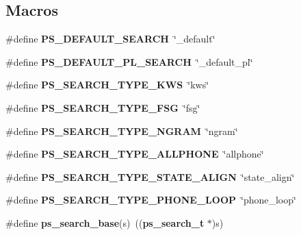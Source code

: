 \subsection*{Macros}
\begin{DoxyCompactItemize}
\item 
\#define {\bfseries P\-S\-\_\-\-D\-E\-F\-A\-U\-L\-T\-\_\-\-S\-E\-A\-R\-C\-H}~\char`\"{}\-\_\-default\char`\"{}\label{pocketsphinx__internal_8h_a84a97dd05f15264c6949498feb139671}

\item 
\#define {\bfseries P\-S\-\_\-\-D\-E\-F\-A\-U\-L\-T\-\_\-\-P\-L\-\_\-\-S\-E\-A\-R\-C\-H}~\char`\"{}\-\_\-default\-\_\-pl\char`\"{}\label{pocketsphinx__internal_8h_a1a7406bb1a164a4428493880ed92f786}

\item 
\#define {\bfseries P\-S\-\_\-\-S\-E\-A\-R\-C\-H\-\_\-\-T\-Y\-P\-E\-\_\-\-K\-W\-S}~\char`\"{}kws\char`\"{}\label{pocketsphinx__internal_8h_adfbaef1de8cda36836738d8abb894a1f}

\item 
\#define {\bfseries P\-S\-\_\-\-S\-E\-A\-R\-C\-H\-\_\-\-T\-Y\-P\-E\-\_\-\-F\-S\-G}~\char`\"{}fsg\char`\"{}\label{pocketsphinx__internal_8h_a76b0af36a87ec087673e6a512848ea70}

\item 
\#define {\bfseries P\-S\-\_\-\-S\-E\-A\-R\-C\-H\-\_\-\-T\-Y\-P\-E\-\_\-\-N\-G\-R\-A\-M}~\char`\"{}ngram\char`\"{}\label{pocketsphinx__internal_8h_ab9a7015925f8a6a4e5a7230c2a91c4f7}

\item 
\#define {\bfseries P\-S\-\_\-\-S\-E\-A\-R\-C\-H\-\_\-\-T\-Y\-P\-E\-\_\-\-A\-L\-L\-P\-H\-O\-N\-E}~\char`\"{}allphone\char`\"{}\label{pocketsphinx__internal_8h_a108d71ca2ec794ec4cf4d7c99f63473d}

\item 
\#define {\bfseries P\-S\-\_\-\-S\-E\-A\-R\-C\-H\-\_\-\-T\-Y\-P\-E\-\_\-\-S\-T\-A\-T\-E\-\_\-\-A\-L\-I\-G\-N}~\char`\"{}state\-\_\-align\char`\"{}\label{pocketsphinx__internal_8h_a3bb128d00e94eb1b227c3a294dd1ce60}

\item 
\#define {\bfseries P\-S\-\_\-\-S\-E\-A\-R\-C\-H\-\_\-\-T\-Y\-P\-E\-\_\-\-P\-H\-O\-N\-E\-\_\-\-L\-O\-O\-P}~\char`\"{}phone\-\_\-loop\char`\"{}\label{pocketsphinx__internal_8h_a101df5cf65a6ad28766a30c63f2f2746}

\item 
\#define {\bfseries ps\-\_\-search\-\_\-base}(s)~(({\bf ps\-\_\-search\-\_\-t} $\ast$)s)\label{pocketsphinx__internal_8h_a27058b099b21336e1fd50299f8596171}


\end{DoxyCompactItemize}
